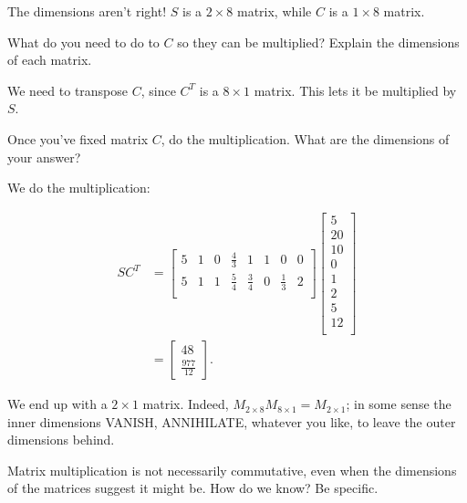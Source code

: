 \documentclass[../gatm_answers.tex]{subfiles}
\begin{document}
The dimensions aren't right! $S$ is a $2\times 8$ matrix, while $C$ is a $1\times 8$ matrix.

\begin{inner_problem}
\item What do you need to do to $C$ so they can be multiplied? Explain the dimensions of each matrix.
\end{inner_problem}

We need to transpose $C$, since $C^T$ is a $8\times 1$ matrix. This lets it be multiplied by $S$.

\begin{inner_problem}
\item Once you've fixed matrix $C$, do the multiplication. What are the dimensions of your answer?
\end{inner_problem}

We do the multiplication:

\begin{align*}
SC^T &= \begin{bmatrix}
5     & 1      & 0     & \frac{4}{3}   & 1    & 1    & 0     & 0 \\
5     & 1      & 1     & \frac{5}{4}   & \frac{3}{4}  & 0    & \frac{1}{3}   & 2 \\
\end{bmatrix}\begin{bmatrix}
5 \\
20 \\
10 \\
0 \\
1 \\
2 \\
5 \\
12 \\
\end{bmatrix} \\
&= \begin{bmatrix}
48 \\
\frac{977}{12}
\end{bmatrix}.
\end{align*}

We end up with a $2\times 1$ matrix. Indeed, $M_{2\times 8}M_{8\times 1} = M_{2\times 1}$; in some sense the inner dimensions VANISH, ANNIHILATE, whatever you like, to leave the outer dimensions behind.

\begin{outer_problem}
\item Matrix multiplication is not necessarily commutative, even when the dimensions of the matrices suggest it might be. How do we know? Be specific.
\end{outer_problem}
\end{document}
